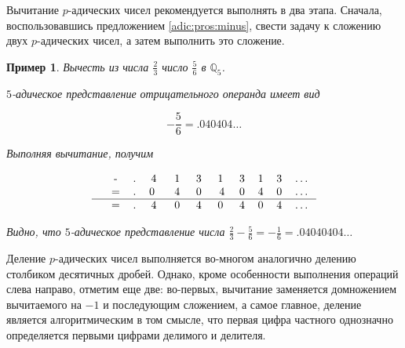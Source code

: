 \documentclass[master, och, diploma, times]{sty/SCWorks}
\theoremstyle{plain}
\newtheorem{exmp}{Пример}[section]
\theoremstyle{definition}
\numberwithin{equation}{section}
\begin{document}
Вычитание $p$-адических чисел рекомендуется выполнять в два этапа. Сначала, воспользовавшись предложением \ref{adic:pros:minus}, свести задачу к сложению двух $p$-адических чисел, а затем выполнить это сложение.

\begin{exmp}
Вычесть из числа $\frac{2}{3}$ число $\frac{5}{6}$ в $\mathbb{Q}_5$.

\noindent $5$-адическое представление отрицательного операнда имеет вид

$$
-\frac{5}{6}=.040404\dots
$$

\noindent Выполняя вычитание, получим

$$
\begin{tabular}{cccccccccccc}
& - & . & 4\; & 1\; & 3\; & 1\; & 3 & 1 & 3 & \dots \\
& = & . & 0 \; & 4\; & 0\; & 4 & 0 & 4 & 0 & \dots \\
\hline
& = & . & 4\; & 0\; & 4\; & 0\; & 4 & 0 & 4 & \dots
\end{tabular}
$$

\noindent Видно, что $5$-адическое представление числа $\frac{2}{3} - \frac{5}{6}=-\frac{1}{6}=.04040404\dots$
\end{exmp}


Деление $p$-адических чисел выполняется во-многом аналогично делению столбиком десятичных дробей. Однако, кроме особенности выполнения операций слева направо, отметим еще две: во-первых, вычитание заменяется домножением вычитаемого на $-1$ и последующим сложением, а самое главное, деление является алгоритмическим в том смысле, что первая цифра частного однозначно определяется первыми цифрами делимого и делителя.
\end{document}
